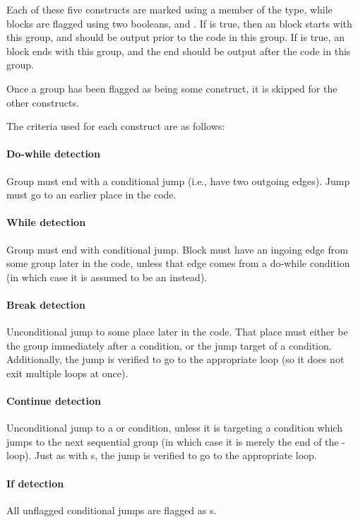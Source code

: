 Each of these five constructs are marked using a  member of the  type, while  blocks are flagged using two booleans,  and . If  is true, then an  block starts with this group, and should be output prior to the code in this group. If  is true, an  block ends with this group, and the end should be output after the code in this group.

Once a group has been flagged as being some construct, it is skipped for the other constructs.

The criteria used for each construct are as follows:

\paragraph{Do-while detection}
Group must end with a conditional jump (i.e., have two outgoing edges). Jump must go to an earlier place in the code.

\paragraph{While detection}
Group must end with conditional jump. Block must have an ingoing edge from some group later in the code, unless that edge comes from a do-while condition (in which case it is assumed to be an  instead).

\paragraph{Break detection}
Unconditional jump to some place later in the code. That place must either be the group immediately after a  condition, or the jump target of a  condition. Additionally, the jump is verified to go to the appropriate loop (so it does not exit multiple loops at once).

\paragraph{Continue detection}
Unconditional jump to a  or  condition, unless it is targeting a  condition which jumps to the next sequential group (in which case it is merely the end of the -loop). Just as with s, the jump is verified to go to the appropriate loop.

\paragraph{If detection}
All unflagged conditional jumps are flagged as s.

